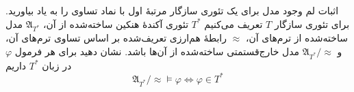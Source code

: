 اثبات لم وجود مدل برای یک تئوری سازگار مرتبهٔ اول با نماد تساوی را به یاد بیاورید. برای تئوری سازگار $T$ تعریف می‌کنیم $T^*$ تئوری آکندهٔ هنکین ساخته‌شده از آن، $\mathfrak{A}_{T^*}$ مدل ساخته‌شده از ترم‌های آن، $\approx$ رابطهٔ هم‌ارزی تعریف‌شده بر اساس تساوی ترم‌های آن، و ${\mathfrak{A}_{T^*}}/{\approx}$ مدل خارج‌قستمتی ساخته‌شده از آن‌ها باشد. نشان دهید برای هر فرمول $\varphi$ در زبان $T^*$ داریم
\[ {\mathfrak{A}_{T^*}}/{\approx} \models \varphi \iff \varphi \in T^* \]